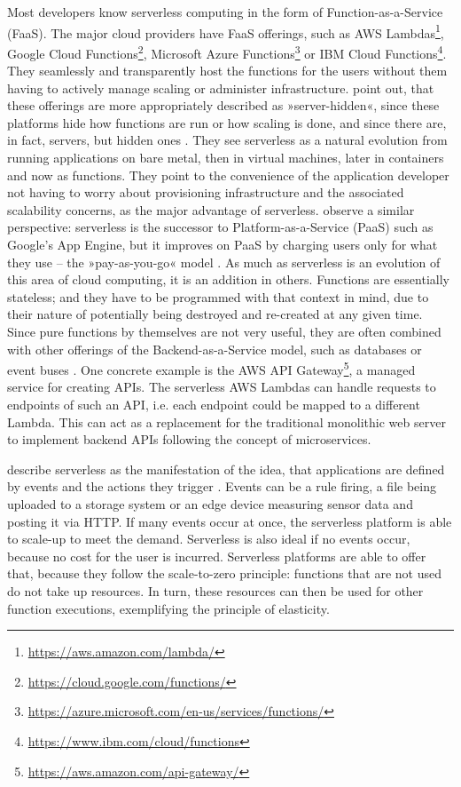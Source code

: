 Most developers know serverless computing in the form of Function-as-a-Service (FaaS). The major cloud providers have FaaS offerings, such as AWS Lambdas\footnote{\url{https://aws.amazon.com/lambda/}}, Google Cloud Functions\footnote{\url{https://cloud.google.com/functions/}}, Microsoft Azure Functions\footnote{\url{https://azure.microsoft.com/en-us/services/functions/}} or IBM Cloud Functions\footnote{\url{https://www.ibm.com/cloud/functions}}. They seamlessly and transparently host the functions for the users without them having to actively manage scaling or administer infrastructure. \citeauthor{Fox2017} point out, that these offerings are more appropriately described as »server-hidden«, since these platforms hide how functions are run or how scaling is done, and since there are, in fact, servers, but hidden ones \cite{Fox2017}. They see serverless as a natural evolution from running applications on bare metal, then in virtual machines, later in containers and now as functions. They point to the convenience of the application developer not having to worry about provisioning infrastructure and the associated scalability concerns, as the major advantage of serverless. \citeauthor{Castro2019} observe a similar perspective: serverless is the successor to Platform-as-a-Service (PaaS) such as Google's App Engine, but it improves on PaaS by charging users only for what they use -- the »pay-as-you-go« model \cite{Castro2019}.
As much as serverless is an evolution of this area of cloud computing, it is an addition in others. Functions are essentially stateless; and they have to be programmed with that context in mind, due to their nature of potentially being destroyed and re-created at any given time. Since pure functions by themselves are not very useful, they are often combined with other offerings of the Backend-as-a-Service model, such as databases or event buses \cite{Eismann2021}. One concrete example is the AWS API Gateway\footnote{\url{https://aws.amazon.com/api-gateway/}}, a managed service for creating APIs. The serverless AWS Lambdas can handle requests to endpoints of such an API, i.e. each endpoint could be mapped to a different Lambda. This can act as a replacement for the traditional monolithic web server to implement backend APIs following the concept of microservices.

\citeauthor{McGrath2017} describe serverless as the manifestation of the idea, that applications are defined by events and the actions they trigger \cite{McGrath2017}. Events can be a rule firing, a file being uploaded to a storage system or an edge device measuring sensor data and posting it via HTTP. If many events occur at once, the serverless platform is able to scale-up to meet the demand. Serverless is also ideal if no events occur, because no cost for the user is incurred. Serverless platforms are able to offer that, because they follow the scale-to-zero principle: functions that are not used do not take up resources. In turn, these resources can then be used for other function executions, exemplifying the principle of elasticity.

